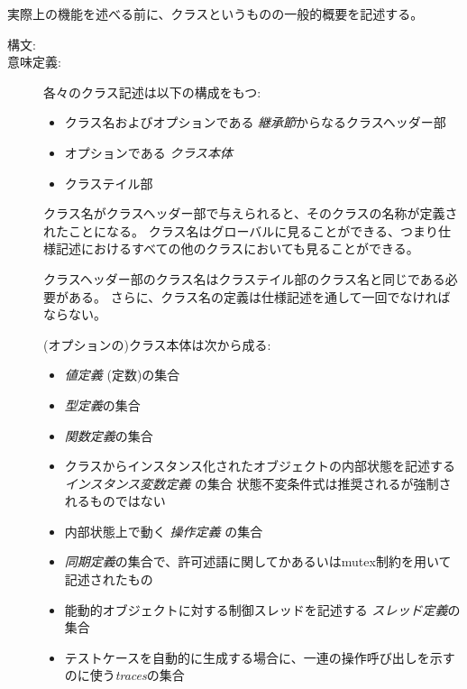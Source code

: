 \documentclass[\pformat,12pt]{jarticle}
\begin{document}
実際上の機能を述べる前に、クラスというものの一般的概要を記述する。

\begin{description}
\item[構文:] 

\item[意味定義:] 各々のクラス記述は以下の構成をもつ:
\begin{itemize}
\item クラス名およびオプションである {\em 継承節}からなるクラスヘッダー部
\item オプションである {\em クラス本体}
\item クラステイル部
\end{itemize}

クラス名がクラスヘッダー部で与えられると、そのクラスの名称が定義されたことになる。 
クラス名はグローバルに見ることができる、つまり仕様記述におけるすべての他のクラスにおいても見ることができる。

クラスヘッダー部のクラス名はクラステイル部のクラス名と同じである必要がある。
 さらに、クラス名の定義は仕様記述を通して一回でなければならない。

 (オプションの)クラス本体は次から成る:
\begin{itemize}
\item  {\it 値定義} (定数)の集合
\item {\it 型定義}の集合
\item {\it 関数定義}の集合
\item クラスからインスタンス化されたオブジェクトの内部状態を記述する{\it インスタンス変数定義} の集合
状態不変条件式は推奨されるが強制されるものではない
\item 内部状態上で動く {\it 操作定義} の集合
\item  {\it 同期定義}の集合で、許可述語に関してかあるいはmutex制約を用いて記述されたもの
\item 能動的オブジェクトに対する制御スレッドを記述する {\it スレッド定義}の集合
\item テストケースを自動的に生成する場合に、一連の操作呼び出しを示すのに使う{\it traces}の集合
\end{itemize}


\end{description}
\end{document}
